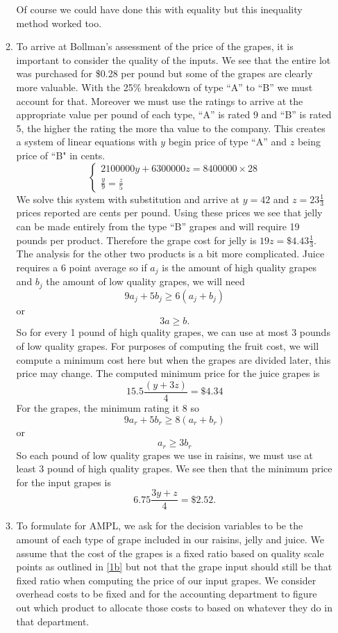 \documentclass[11pt]{article}
\begin{document}
\begin{enumerate}
\begin{enumerate}
Of course we could have done this with equality but this inequality method worked too.

\item To arrive at Bollman's assessment of the price of the grapes, it is important to consider the quality of the inputs.  We see that the entire lot was purchased for \$0.28 per pound but some of the grapes are clearly more valuable.  With the 25\% breakdown of type ``A'' to ``B'' we must account for that.  Moreover we must use the ratings to arrive at the appropriate value per pound of each type, ``A'' is rated 9 and ``B'' is rated 5, the higher the rating the more tha value to the company.  This creates a system of linear equations with $y$ begin price of type ``A'' and $z$ being price of ``B" in cents.  
\[
\left\{
\begin{array}{l}
2 100 000 y +6 300 000 z = 8 400 000 \times 28\\
\frac{y}{9} = \frac{z}{5}
\end{array}
\right.
\]
We solve this system with substitution and arrive at $y = 42$ and $z = 23\frac13$ prices reported are cents per pound.  Using these prices we see that jelly can be made entirely from the type ``B'' grapes and will require 19 pounds per product.  Therefore the grape cost for jelly is $19z = \$4.43\frac13$.  The analysis for the other two products is a bit more complicated.  Juice requires a 6 point average so if $a_j$ is the amount of high quality grapes and $b_j$ the amount of low quality grapes, we will need 
\[
9a_j+5b_j \geq 6(a_j+b_j)
\]
or
\[
3a \geq b.
\]
So for every 1 pound of high quality grapes, we can use at most 3 pounds of low quality grapes.  For purposes of computing the fruit cost, we will compute a minimum cost here but when the grapes are divided later, this price may change.  The computed minimum price for the juice grapes is
\[
15.5\frac{\left(y+3z\right)}{4} = \$4.34
\]
For the grapes, the minimum rating it 8 so
\[
9a_r+5b_r\geq 8(a_r+b_r)
\]
or
\[
a_r\geq 3b_r
\]
So each pound of low quality grapes we use in raisins, we must use at least 3 pound of high quality grapes.  We see then that the minimum price for the input grapes is \label{1b}
\[
6.75\frac{3y+z}4 = \$2.52.
\]
\item To formulate for AMPL, we ask for the decision variables to be the amount of each type of grape included in our raisins, jelly and juice.  We assume that the cost of the grapes is a fixed ratio based on quality scale points as outlined in \ref{1b} but not that the grape input should still be that fixed ratio when computing the price of our input grapes.  We consider overhead costs to be fixed and for the accounting department to figure out which product to allocate those costs to based on whatever they do in that department.


\end{enumerate}
\end{enumerate}
\end{document}
